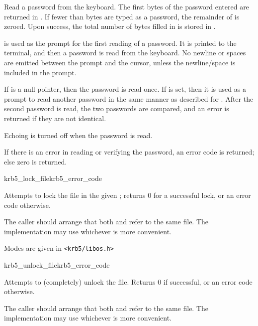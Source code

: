 Read a password from the keyboard.  The first 
bytes of the password entered are returned in .
If fewer than  bytes are typed as a password,
the remainder of  is zeroed.  Upon success, the
total number of bytes filled in is stored in .

 is used as the prompt for the first reading of a password.
It is printed to the terminal, and then a password is read from the
keyboard.  No newline or spaces are emitted between the prompt and the
cursor, unless the newline/space is included in the prompt.

If  is a null pointer, then the password is read
once.  If  is set, then it is used as a prompt to
read another password in the same manner as described for
.  After the second password is read, the two
passwords are compared, and an error is returned if they are not
identical.

Echoing is turned off when the password is read.

If there is an error in reading or verifying the password, an error code
is returned; else zero is returned.

\begin{funcdecl}{krb5_lock_file}{krb5_error_code}{\funcvoid}
\end{funcdecl}

Attempts to lock the file in the given ; returns 0 for a
successful lock, or an error code otherwise.

The caller should arrange that both  and
 refer to the same
file.  The implementation may use whichever is more convenient.

Modes are given in {\tt <krb5/libos.h>}


\begin{funcdecl}{krb5_unlock_file}{krb5_error_code}{\funcvoid}
\end{funcdecl}

Attempts to (completely) unlock the file.  Returns 0 if successful,
or an error code otherwise.

The caller should arrange that both  and
 refer to the same file.  The implementation may
use whichever is more convenient.

